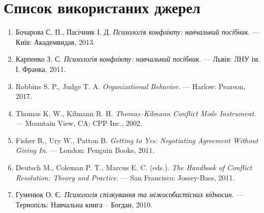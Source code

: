 \documentclass[12pt,a4paper]{article}
\begin{document}

    \section*{Список використаних джерел}
    \begin{enumerate}
        \item Бочарова С. П., Пасічник І. Д. \textit{Психологія конфлікту: навчальний посібник}. --- Київ: Академвидав, 2013.
        \item Карпенко З. С. \textit{Психологія конфлікту: навчальний посібник}. --- Львів: ЛНУ ім. І. Франка, 2011.
        \item Robbins S. P., Judge T. A. \textit{Organizational Behavior}. --- Harlow: Pearson, 2017.
        \item Thomas K. W., Kilmann R. H. \textit{Thomas–Kilmann Conflict Mode Instrument}. --- Mountain View, CA: CPP Inc., 2002.
        \item Fisher R., Ury W., Patton B. \textit{Getting to Yes: Negotiating Agreement Without Giving In}. --- London: Penguin Books, 2011.
        \item Deutsch M., Coleman P. T., Marcus E. C. (eds.). \textit{The Handbook of Conflict Resolution: Theory and Practice}. --- San Francisco: Jossey-Bass, 2011.
        \item Гуменюк О. Є. \textit{Психологія спілкування та міжособистісних відносин}. --- Тернопіль: Навчальна книга – Богдан, 2010.
    \end{enumerate}
\end{document}
